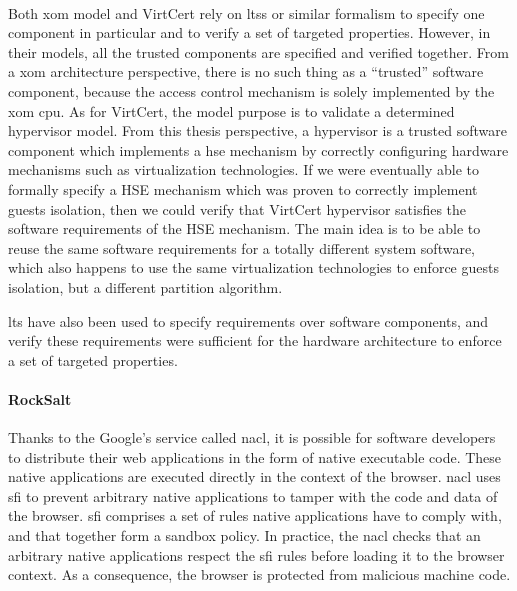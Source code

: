 \paragraph{}
%
Both \ac{xom} model and VirtCert rely on \acp{lts} or similar formalism to
specify one component in particular and to verify a set of targeted properties.
%
However, in their models, all the trusted components are specified and verified
together.
%
From a \ac{xom} architecture perspective, there is no such thing as a
``trusted'' software component, because the access control mechanism is solely
implemented by the \ac{xom} \ac{cpu}.
%
As for VirtCert, the model purpose is to validate a determined hypervisor model.
%
From this thesis perspective, a hypervisor is a trusted software component which
implements a \ac{hse} mechanism by correctly configuring hardware mechanisms
such as virtualization technologies.
%
If we were eventually able to formally specify a HSE mechanism which was proven
to correctly implement guests isolation, then we could verify that VirtCert
hypervisor satisfies the software requirements of the HSE mechanism.
%
The main idea is to be able to reuse the same software requirements for a
totally different system software, which also happens to use the same
virtualization technologies to enforce guests isolation, but a different
partition algorithm.

\ac{lts} have also been used to specify requirements over software components,
and verify these requirements were sufficient for the hardware architecture to
enforce a set of targeted properties.

\paragraph{RockSalt}
%
Thanks to the Google's service called \ac{nacl}, it is possible for software
developers to distribute their web applications in the form of native executable
code.
%
These native applications are executed directly in the context of the browser.
%
\ac{nacl} uses \ac{sfi} to prevent arbitrary native applications to tamper with
the code and data of the browser.
%
\ac{sfi} comprises a set of rules native applications have to comply with, and
that together form a sandbox policy.
%
In practice, the \ac{nacl} checks that an arbitrary native applications respect
the \ac{sfi} rules before loading it to the browser context.
%
As a consequence, the browser is protected from malicious machine code.


